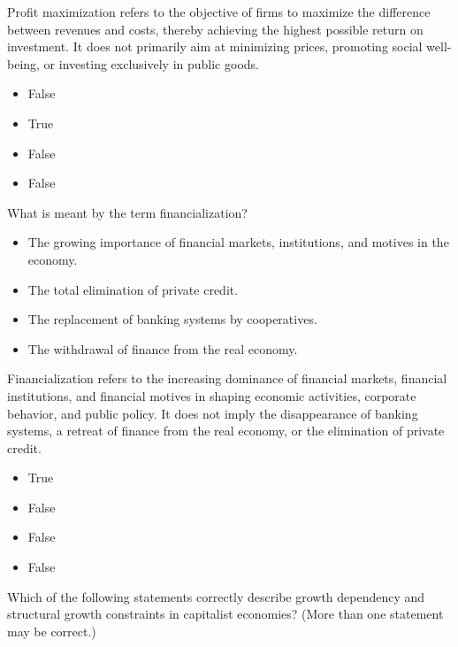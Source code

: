 \documentclass[
  a4paper,
  DIV=11,
  numbers=noendperiod,
  oneside,
  openany]{scrreprt}
\providecommand{\tightlist}{%
  \setlength{\itemsep}{0pt}\setlength{\parskip}{0pt}}
\begin{document}
Profit maximization refers to the objective of firms to maximize the
difference between revenues and costs, thereby achieving the highest
possible return on investment. It does not primarily aim at minimizing
prices, promoting social well-being, or investing exclusively in public
goods.

\begin{itemize}
\tightlist
\item
  False
\item
  True
\item
  False
\item
  False
\end{itemize}

What is meant by the term financialization?

\begin{itemize}
\tightlist
\item[$\square$]
  The growing importance of financial markets, institutions, and motives
  in the economy.
\item[$\square$]
  The total elimination of private credit.
\item[$\square$]
  The replacement of banking systems by cooperatives.
\item[$\square$]
  The withdrawal of finance from the real economy.
\end{itemize}

Financialization refers to the increasing dominance of financial
markets, financial institutions, and financial motives in shaping
economic activities, corporate behavior, and public policy. It does not
imply the disappearance of banking systems, a retreat of finance from
the real economy, or the elimination of private credit.

\begin{itemize}
\tightlist
\item
  True
\item
  False
\item
  False
\item
  False
\end{itemize}

Which of the following statements correctly describe growth dependency
and structural growth constraints in capitalist economies? (More than
one statement may be correct.)
\end{document}

